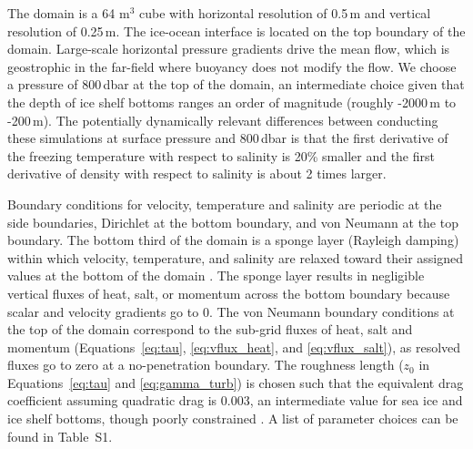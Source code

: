 \documentclass[tc, manuscript]{copernicus}
\begin{document}
The domain is a 64 m$^3$ cube with horizontal resolution of 0.5\,\unit{m} and vertical resolution of 0.25\,\unit{m}. The ice-ocean interface is located on the top boundary of the domain. Large-scale horizontal pressure gradients drive the mean flow, which is geostrophic in the far-field where buoyancy does not modify the flow. We choose a pressure of 800\,\unit{dbar} at the top of the domain, an intermediate choice given that the depth of ice shelf bottoms ranges an order of magnitude (roughly -2000\,\unit{m} to -200\,\unit{m}). The potentially dynamically relevant differences between conducting these simulations at surface pressure and 800\,\unit{dbar} is that the first derivative of the freezing temperature with respect to salinity is 20\% smaller and the first derivative of density with respect to salinity is about 2 times larger.

Boundary conditions for velocity, temperature and salinity are periodic at the side boundaries, Dirichlet at the bottom boundary, and von Neumann at the top boundary. The bottom third of the domain is a sponge layer (Rayleigh damping) within which velocity, temperature, and salinity are relaxed toward their assigned values at the bottom of the domain \citep{klemp_numerical_1978, maronga_parallelized_2015}. The sponge layer results in negligible vertical fluxes of heat, salt, or momentum across the bottom boundary because scalar and velocity gradients go to 0. The von Neumann boundary conditions at the top of the domain correspond to the sub-grid fluxes of heat, salt and momentum (Equations~\ref{eq:tau}, \ref{eq:vflux_heat}, and \ref{eq:vflux_salt}), as resolved fluxes go to zero at a no-penetration boundary. The roughness length ($z_0$ in Equations~\ref{eq:tau} and \ref{eq:gamma_turb}) is chosen such that the equivalent drag coefficient assuming quadratic drag is 0.003, an intermediate value for sea ice and ice shelf bottoms, though poorly constrained \citep{holland_modeling_1999, holland_effects_2006, macayeal_numerical_1984, nicholls_measurements_2006}. A list of parameter choices can be found in Table~S1.
\end{document}

